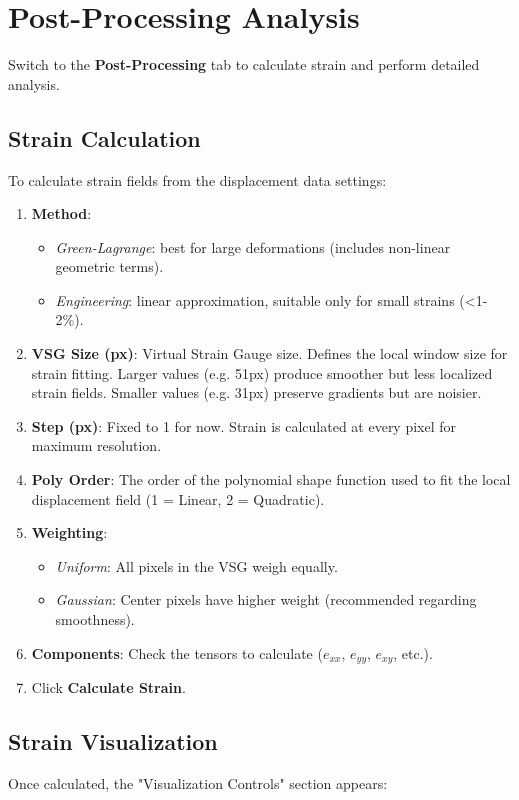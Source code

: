 \documentclass[a4paper,12pt]{article}
\begin{document}
\section{Post-Processing Analysis}
Switch to the \textbf{Post-Processing} tab to calculate strain and perform detailed analysis.

\subsection{Strain Calculation}
To calculate strain fields from the displacement data settings:



\begin{enumerate}
    \item \textbf{Method}:
    \begin{itemize}
        \item \textit{Green-Lagrange}: best for large deformations (includes non-linear geometric terms).
        \item \textit{Engineering}: linear approximation, suitable only for small strains (<1-2\%).
    \end{itemize}
    \item \textbf{VSG Size (px)}: Virtual Strain Gauge size. Defines the local window size for strain fitting. Larger values (e.g. 51px) produce smoother but less localized strain fields. Smaller values (e.g. 31px) preserve gradients but are noisier.
    \item \textbf{Step (px)}: Fixed to 1 for now. Strain is calculated at every pixel for maximum resolution.
    \item \textbf{Poly Order}: The order of the polynomial shape function used to fit the local displacement field (1 = Linear, 2 = Quadratic).
    \item \textbf{Weighting}: 
    \begin{itemize}
        \item \textit{Uniform}: All pixels in the VSG weigh equally.
        \item \textit{Gaussian}: Center pixels have higher weight (recommended regarding smoothness).
    \end{itemize}
    \item \textbf{Components}: Check the tensors to calculate ($e_{xx}$, $e_{yy}$, $e_{xy}$, etc.).
    \item Click \textbf{Calculate Strain}.
\end{enumerate}

\subsection{Strain Visualization}
Once calculated, the "Visualization Controls" section appears:
\end{document}

